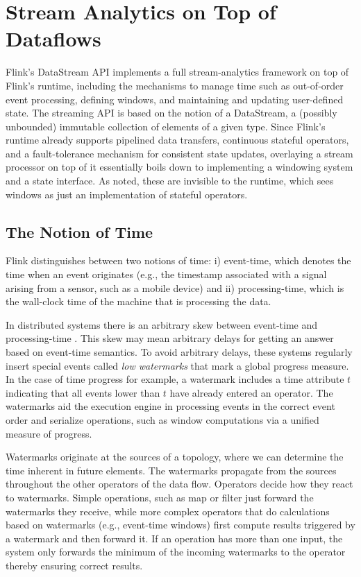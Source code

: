 \documentclass[11pt]{article}
\begin{document}
\section{Stream Analytics on Top of Dataflows}
\label{sec:streaming}
\vspace{-3mm}

Flink's DataStream API implements a full stream-analytics framework on top of Flink's runtime, including the mechanisms to manage time such as out-of-order event processing, defining windows, and maintaining and updating user-defined state. The streaming API is based on the notion of a DataStream, a (possibly unbounded) immutable collection of elements of a given type. Since Flink's runtime already supports pipelined data transfers, continuous stateful operators, and a fault-tolerance mechanism for consistent state updates, overlaying a stream processor on top of it essentially boils down to implementing a windowing system and a state interface. As noted, these are invisible to the runtime, which sees windows as just an implementation of stateful operators. 

\vspace{-3mm}
\subsection{The Notion of Time}
\label{sec:streaming-time}
\vspace{-2mm}
Flink distinguishes between two notions of time: i) event-time, which denotes the time when an event originates (e.g., the timestamp associated with a  signal arising from a sensor, such as a mobile device) and ii) processing-time, which is the wall-clock time of the machine that is processing the data.

In distributed systems there is an arbitrary skew between event-time and processing-time \cite{akidau2015dataflow}. This skew may mean arbitrary delays for getting an answer based on event-time semantics. To avoid arbitrary delays, these systems regularly insert special events called \emph{low watermarks} that mark a global progress measure. In the case of time progress for example, a watermark includes a time attribute $t$ indicating that all events lower than $t$ have already entered an operator. The watermarks aid the execution engine in processing events in the correct event order and serialize operations, such as window computations via a unified measure of progress.

Watermarks originate at the sources of a topology, where we can determine the time inherent in future elements. The watermarks propagate from the sources throughout the other operators of the data flow. Operators decide how they react to watermarks. Simple operations, such as map or filter just forward the watermarks they receive, while more complex operators that do calculations based on watermarks (e.g., event-time windows) first compute results triggered by a watermark and then forward it. If an operation has more than one input, the system only forwards the minimum of the incoming watermarks to the operator thereby ensuring correct results.
\end{document}
